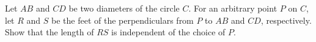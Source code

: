 Let $AB$ and $CD$ be two diameters of the circle $C$. For an arbitrary point $P$ on $C$,  let $R$ and $S$ be the feet of the perpendiculars from $P$ to $AB$ and $CD$,  respectively. Show that the length of $RS$ is independent of the choice of $P$.